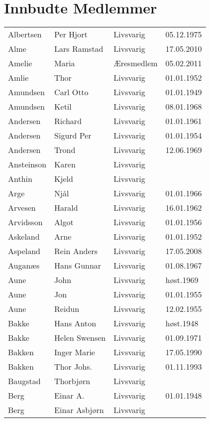 
\chapter*{Innbudte Medlemmer}

    \begin{longtable}{llll}
Albertsen	&	Per Hjort	&	Livsvarig 	&	05.12.1975	\\
Alme	&	Lars Ramstad	&	Livsvarig	&	17.05.2010	\\
Amelie	&	Maria		&	Æresmedlem	&	05.02.2011      \\
Amlie	&	Thor	&	Livsvarig 	&	01.01.1952	\\
Amundsen	&	Carl Otto	&	Livsvarig 	&	01.01.1949	\\
Amundsen	&	Ketil	&	Livsvarig 	&	08.01.1968	\\
Andersen	&	Richard	&	Livsvarig 	&	01.01.1961	\\
Andersen	&	Sigurd Per	&	Livsvarig 	&	01.01.1954	\\
Andersen	&	Trond	&	Livsvarig 	&	12.06.1969	\\
Ansteinson	&	Karen	&	Livsvarig 	&		\\
Anthin	&	Kjeld	&	Livsvarig 	&		\\
Arge	&	Njål	&	Livsvarig 	&	01.01.1966	\\
Arvesen	&	Harald	&	Livsvarig 	&	16.01.1962	\\
Arvidsson	&	Algot	&	Livsvarig 	&	01.01.1956	\\
Askeland	&	Arne	&	Livsvarig 	&	01.01.1952	\\
Aspeland	&	Rein Anders	&	Livsvarig	&	17.05.2008	\\
Auganæs	&	Hans Gunnar	&	Livsvarig 	&	01.08.1967	\\
Aune	&	John	&	Livsvarig 	&	høst.1969	\\
Aune	&	Jon	&	Livsvarig 	&	01.01.1955	\\
Aune	&	Reidun	&	Livsvarig 	&	12.02.1955	\\
Bakke	&	Hans Anton	&	Livsvarig	&	høst.1948	\\
Bakke	&	Helen Swensen	&	Livsvarig 	&	01.09.1971	\\
Bakken	&	Inger Marie	&	Livsvarig 	&	17.05.1990	\\
Bakken	&	Thor Johs.	&	Livsvarig 	&	01.11.1993	\\
Baugstad	&	Thorbjørn	&	Livsvarig 	&		\\
Berg	&	Einar A.	&	Livsvarig 	&	01.01.1948	\\
Berg	&	Einar Asbjørn	&	Livsvarig 	&		\\

\end{longtable}
